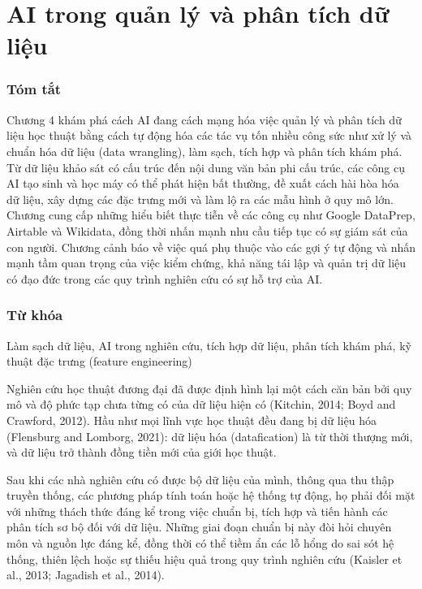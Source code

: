 \chapter{AI trong quản lý và phân tích dữ liệu}

\subsection{Tóm tắt}

Chương 4 khám phá cách AI đang cách mạng hóa việc quản lý và phân tích dữ liệu học thuật bằng cách tự động hóa các tác vụ tốn nhiều công sức như xử lý và chuẩn hóa dữ liệu (data wrangling), làm sạch, tích hợp và phân tích khám phá. Từ dữ liệu khảo sát có cấu trúc đến nội dung văn bản phi cấu trúc, các công cụ AI tạo sinh và học máy có thể phát hiện bất thường, đề xuất cách hài hòa hóa dữ liệu, xây dựng các đặc trưng mới và làm lộ ra các mẫu hình ở quy mô lớn. Chương cung cấp những hiểu biết thực tiễn về các công cụ như Google DataPrep, Airtable và Wikidata, đồng thời nhấn mạnh nhu cầu tiếp tục có sự giám sát của con người. Chương cảnh báo về việc quá phụ thuộc vào các gợi ý tự động và nhấn mạnh tầm quan trọng của việc kiểm chứng, khả năng tái lập và quản trị dữ liệu có đạo đức trong các quy trình nghiên cứu có sự hỗ trợ của AI.

\subsection{Từ khóa}

Làm sạch dữ liệu, AI trong nghiên cứu, tích hợp dữ liệu, phân tích khám phá, kỹ thuật đặc trưng (feature engineering)

Nghiên cứu học thuật đương đại đã được định hình lại một cách căn bản bởi quy mô và độ phức tạp chưa từng có của dữ liệu hiện có (Kitchin, 2014; Boyd and Crawford, 2012). Hầu như mọi lĩnh vực học thuật đều đang bị dữ liệu hóa (Flensburg and Lomborg, 2021): dữ liệu hóa (datafication) là từ thời thượng mới, và dữ liệu trở thành đồng tiền mới của giới học thuật.

Sau khi các nhà nghiên cứu có được bộ dữ liệu của mình, thông qua thu thập truyền thống, các phương pháp tính toán hoặc hệ thống tự động, họ phải đối mặt với những thách thức đáng kể trong việc chuẩn bị, tích hợp và tiến hành các phân tích sơ bộ đối với dữ liệu. Những giai đoạn chuẩn bị này đòi hỏi chuyên môn và nguồn lực đáng kể, đồng thời có thể tiềm ẩn các lỗ hổng do sai sót hệ thống, thiên lệch hoặc sự thiếu hiệu quả trong quy trình nghiên cứu (Kaisler et al., 2013; Jagadish et al., 2014).

